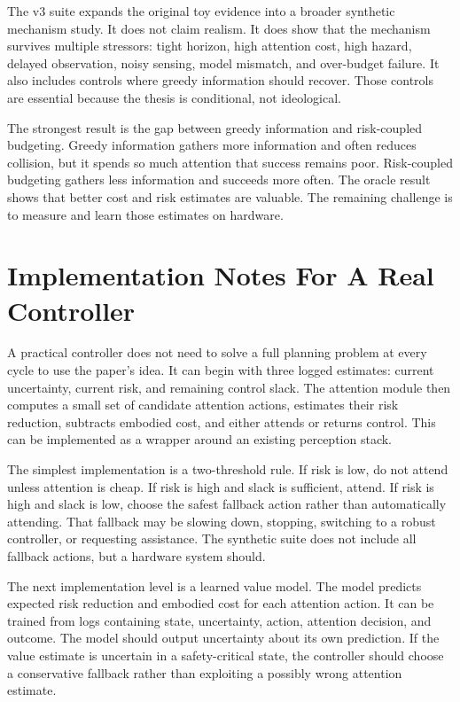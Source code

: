 \documentclass{article}
\begin{document}
The v3 suite expands the original toy evidence into a broader synthetic
mechanism study. It does not claim realism. It does show that the mechanism
survives multiple stressors: tight horizon, high attention cost, high hazard,
delayed observation, noisy sensing, model mismatch, and over-budget failure.
It also includes controls where greedy information should recover. Those
controls are essential because the thesis is conditional, not ideological.

The strongest result is the gap between greedy information and risk-coupled
budgeting. Greedy information gathers more information and often reduces
collision, but it spends so much attention that success remains poor.
Risk-coupled budgeting gathers less information and succeeds more often. The
oracle result shows that better cost and risk estimates are valuable. The
remaining challenge is to measure and learn those estimates on hardware.

\section{Implementation Notes For A Real Controller}

A practical controller does not need to solve a full planning problem at every
cycle to use the paper's idea. It can begin with three logged estimates:
current uncertainty, current risk, and remaining control slack. The attention
module then computes a small set of candidate attention actions, estimates
their risk reduction, subtracts embodied cost, and either attends or returns
control. This can be implemented as a wrapper around an existing perception
stack.

The simplest implementation is a two-threshold rule. If risk is low, do not
attend unless attention is cheap. If risk is high and slack is sufficient,
attend. If risk is high and slack is low, choose the safest fallback action
rather than automatically attending. That fallback may be slowing down,
stopping, switching to a robust controller, or requesting assistance. The
synthetic suite does not include all fallback actions, but a hardware system
should.

The next implementation level is a learned value model. The model predicts
expected risk reduction and embodied cost for each attention action. It can be
trained from logs containing state, uncertainty, action, attention decision,
and outcome. The model should output uncertainty about its own prediction. If
the value estimate is uncertain in a safety-critical state, the controller
should choose a conservative fallback rather than exploiting a possibly wrong
attention estimate.
\end{document}
